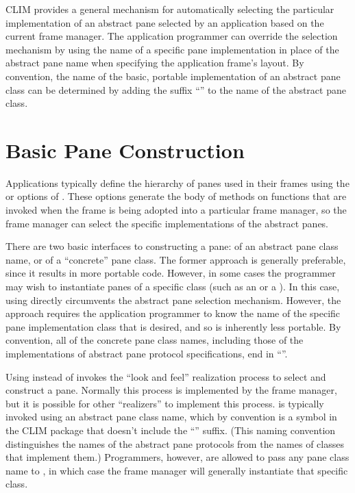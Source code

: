 CLIM provides a general mechanism for automatically selecting the particular
implementation of an abstract pane selected by an application based on the
current frame manager.  The application programmer can override the selection
mechanism by using the name of a specific pane implementation in place of the
abstract pane name when specifying the application frame's layout.  By
convention, the name of the basic, portable implementation of an abstract pane
class can be determined by adding the suffix ``'' to the name of the
abstract pane class.


\section {Basic Pane Construction}

Applications typically define the hierarchy of panes used in their frames using
the  or  options of .  These
options generate the body of methods on functions that are invoked when the
frame is being adopted into a particular frame manager, so the frame manager can
select the specific implementations of the abstract panes.

There are two basic interfaces to constructing a pane:  of an
abstract pane class name, or  of a ``concrete'' pane class.
The former approach is generally preferable, since it results in more portable
code.  However, in some cases the programmer may wish to instantiate panes of a
specific class (such as an  or a ).  In this case,
using  directly circumvents the abstract pane selection
mechanism.  However, the  approach requires the application
programmer to know the name of the specific pane implementation class that is
desired, and so is inherently less portable.  By convention, all of the concrete
pane class names, including those of the implementations of abstract pane
protocol specifications, end in ``''.

Using  instead of  invokes the ``look and feel''
realization process to select and construct a pane.  Normally this process is
implemented by the frame manager, but it is possible for other ``realizers'' to
implement this process.   is typically invoked using an abstract
pane class name, which by convention is a symbol in the CLIM package that
doesn't include the ``'' suffix.  (This naming convention
distinguishes the names of the abstract pane protocols from the names of classes
that implement them.)  Programmers, however, are allowed to pass any pane class
name to , in which case the frame manager will generally
instantiate that specific class.

